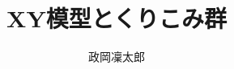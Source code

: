\documentclass[12pt]{ltjsarticle}
\begin{document}
\title{XY模型とくりこみ群}
\author{政岡凜太郎}
\maketitle


\end{document}
